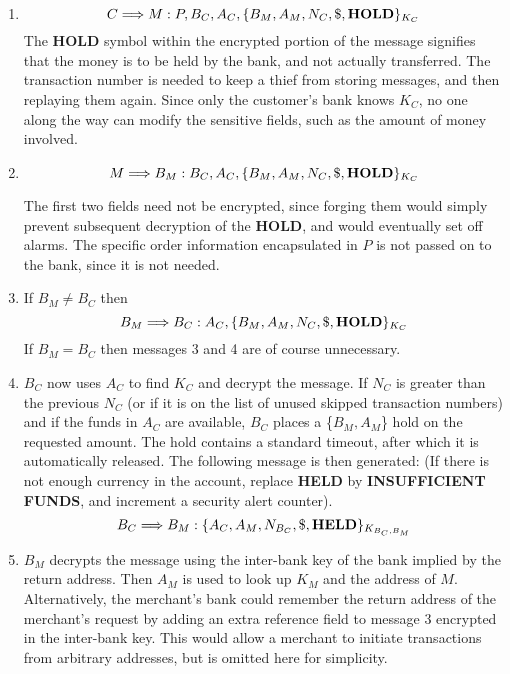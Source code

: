 \begin{enumerate}

\item  \[ C \Longrightarrow M : P, B_{C}, A_{C}, \{B_{M}, A_{M}, N_{C},  \$,
		{\bf HOLD}\}_{K_{C}} \]
The {\bf HOLD} symbol within the encrypted portion of the message
signifies that the
money is to be held by the bank, and not actually transferred.  The
transaction number is
needed to keep a thief from storing messages, and then replaying them
again.  Since only the customer's bank knows $K_{C}$, no one along the way can
modify the sensitive fields, such as the amount of money involved.

\item \[ M \Longrightarrow B_{M} : B_{C}, A_{C}, \{B_{M}, A_{M}, N_{C},
		\$, {\bf HOLD}\}_{K_{C}} \]

The first two fields need not be encrypted, since forging them would simply
prevent subsequent decryption of the {\bf HOLD}, and would eventually set
off alarms.  The specific order information encapsulated in $P$ is not
passed on to the bank, since it is not needed.

\item If $B_{M} \neq B_{C}$ then
\[ B_{M} \Longrightarrow B_{C} : A_{C}, \{B_{M}, A_{M}, N_{C},  \$,
		{\bf HOLD}\}_{K_{C}} \]
If $B_{M} = B_{C}$ then messages 3 and 4 are of course unnecessary.
\item $B_{C}$ now uses $A_{C}$ to find $K_{C}$ and decrypt the message.  If
$N_{C}$ is greater than the previous $N_{C}$ (or if it is on the list of unused
skipped transaction numbers)
and if the funds in $A_{C}$ are available, $B_{C}$ places a
\{$B_{M}, A_{M}$\} hold on the requested
amount.  The hold contains
a standard timeout, after which it is automatically released.  The
following message is then generated: (If there is not enough currency in
the account, replace {\bf HELD} by {\bf INSUFFICIENT FUNDS}, and increment
a security alert counter).
\[B_{C} \Longrightarrow B_{M} : \{A_{C}, A_{M}, N_{B_{C}}, \$,  {\bf HELD}
			\}_{K_{B_{C},B_{M}}} \]


\item $B_{M}$ decrypts the message using the inter-bank key of the
bank implied by the return address.
Then $A_{M}$ is used to look up $K_{M}$ and the address of $M$.
Alternatively, the merchant's bank could remember the return address of the
merchant's request by adding an extra reference field to message 3
encrypted in the inter-bank key.  This
would allow a merchant to initiate transactions from arbitrary addresses,
but is omitted here for simplicity.


\end{enumerate}

